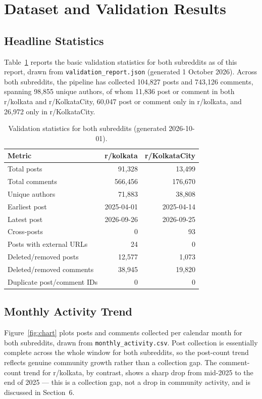 \documentclass[12pt]{article}
\begin{document}
\section{Dataset and Validation Results}

\subsection{Headline Statistics}
Table~\ref{tab:validation} reports the basic validation statistics for both subreddits as of this
report, drawn from \texttt{validation\_report.json} (generated 1 October 2026). Across both
subreddits, the pipeline has collected 104,827 posts and 743,126 comments, spanning 98,855
unique authors, of whom 11,836 post or comment in both r/kolkata and r/KolkataCity, 60,047
post or comment only in r/kolkata, and 26,972 only in r/KolkataCity.

\begin{table}[h]
\centering
\small
\caption{Validation statistics for both subreddits (generated 2026-10-01).}
\label{tab:validation}
\begin{tabular}{lrr}
\toprule
\textbf{Metric} & \textbf{r/kolkata} & \textbf{r/KolkataCity} \\
\midrule
Total posts & 91{,}328 & 13{,}499 \\
Total comments & 566{,}456 & 176{,}670 \\
Unique authors & 71{,}883 & 38{,}808 \\
Earliest post & 2025-04-01 & 2025-04-14 \\
Latest post & 2026-09-26 & 2026-09-25 \\
Cross-posts & 0 & 93 \\
Posts with external URLs & 24 & 0 \\
Deleted/removed posts & 12{,}577 & 1{,}073 \\
Deleted/removed comments & 38{,}945 & 19{,}820 \\
Duplicate post/comment IDs & 0 & 0 \\
\bottomrule
\end{tabular}
\end{table}
\vspace{-0.5cm}

\subsection{Monthly Activity Trend}
Figure~\ref{fig:chart} plots posts and comments collected per calendar month for both
subreddits, drawn from \texttt{monthly\_activity.csv}. Post collection is essentially complete
across the whole window for both subreddits, so the post-count trend reflects genuine community
growth rather than a collection gap. The comment-count trend for r/kolkata, by contrast, shows a
sharp drop from mid-2025 to the end of 2025 — this is a collection gap, not a drop in community
activity, and is discussed in Section~6.
\end{document}
